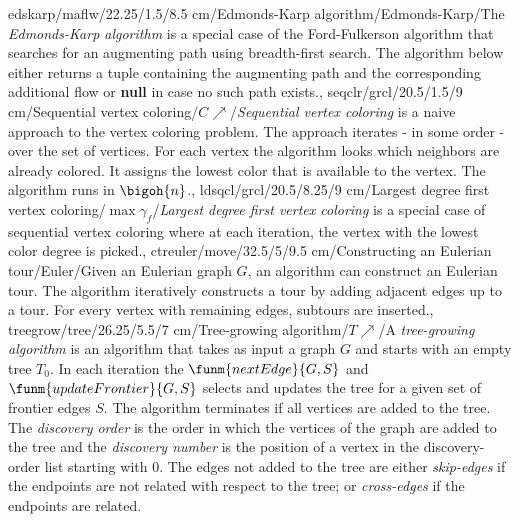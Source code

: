 edskarp/maflw/22.25/1.5/8.5 cm/{Edmonds-Karp algorithm}/{Edmonds-Karp}/{The \emph{Edmonds-Karp algorithm} is a special case of the Ford-Fulkerson algorithm that searches for an augmenting path using breadth-first search. The algorithm below either returns a tuple containing the augmenting path and the corresponding additional flow or \textbf{null} in case no such path exists.},
seqclr/grcl/20.5/1.5/9 cm/{Sequential vertex coloring}/{$C\nearrow$}/{\emph{Sequential vertex coloring} is a naive approach to the vertex coloring problem. The approach iterates - in some order - over the set of vertices. For each vertex the algorithm looks which neighbors are already colored. It assigns the lowest color that is available to the vertex. The algorithm runs in $\bigoh{n}$.},
ldsqcl/grcl/20.5/8.25/9 cm/{Largest degree first vertex coloring}/{$\max\gamma_f$}/{\emph{Largest degree first vertex coloring} is a special case of sequential vertex coloring where at each iteration, the vertex with the lowest color degree is picked.},
ctreuler/move/32.5/5/9.5 cm/{Constructing an Eulerian tour}/{Euler}/{Given an Eulerian graph $G$, an algorithm can construct an Eulerian tour. The algorithm iteratively constructs a tour by adding adjacent edges up to a tour. For every vertex with remaining edges, subtours are inserted.},
treegrow/tree/26.25/5.5/7 cm/{Tree-growing algorithm}/{$T\nearrow$}/{A \emph{tree-growing algorithm} is an algorithm that takes as input a graph $G$ and starts with an empty tree $T_0$. In each iteration the $\funm{nextEdge}{G,S}$ and $\funm{updateFrontier}{G,S}$ selects and updates the tree for a given set of frontier edges $S$. The algorithm terminates if all vertices are added to the tree. The \emph{discovery order} is the order in which the vertices of the graph are added to the tree and the \emph{discovery number} is the position of a vertex in the discovery-order list starting with $0$. The edges not added to the tree are either \emph{skip-edges} if the endpoints are not related with respect to the tree; or \emph{cross-edges} if the endpoints are related.}